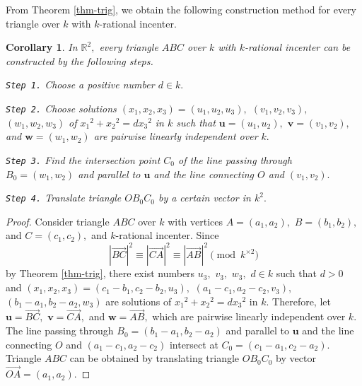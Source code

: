 \documentclass{article}
\theoremstyle{definition}
\theoremstyle{plain}
\newtheorem{cor}{Corollary}
\newenvironment{pf}{\begin{proof}}{\end{proof}}
\begin{document}
From Theorem \ref{thm-trig}, we obtain the following construction method for every triangle over $k$ with $k$-rational incenter.
\begin{cor}
In $\mathbb R^2,$ every triangle $ABC$ over $k$ with $k$-rational incenter can be constructed by the following steps.\par
{\tt Step 1.} 
Choose a positive number $d \in k.$\par
{\tt Step 2.} 
Choose solutions $(x_1,x_2,x_3) = (u_1,u_2,u_3),$ $(v_1,v_2,v_3),$ $(w_1,w_2,w_3)$ of $x_1{}^2+x_2{}^2 = dx_3{}^2$ in $k$ such that $\bm{u} = (u_1,u_2),$ $\bm{v} = (v_1,v_2),$ and $\bm{w} = (w_1,w_2)$ are pairwise linearly independent over $k.$\par
{\tt Step 3.} 
Find the intersection point $C_0$ of the line passing through $B_0 = (w_1,w_2)$ and parallel to $\bm{u}$ and the line connecting $O$ and $(v_1,v_2).$\par
{\tt Step 4.} 
Translate triangle $OB_0C_0$ by a certain vector in $k^2.$
\end{cor}
\begin{pf}
Consider triangle $ABC$ over $k$ with vertices $A = (a_1,a_2),$ $B = (b_1,b_2),$ and $C = (c_1,c_2),$ and $k$-rational incenter. 
Since 
\[ |\overrightarrow{BC}|^2 \equiv |\overrightarrow{CA}|^2 \equiv |\overrightarrow{AB}|^2 \pmod{k^{\times 2}}\] 
by Theorem \ref{thm-trig}, there exist numbers $u_3,$ $v_3,$ $w_3,$ $d \in k$ such that $d > 0$ and $(x_1,x_2,x_3) = (c_1-b_1,c_2-b_2,u_3),$ $(a_1-c_1,a_2-c_2,v_3),$ $(b_1-a_1,b_2-a_2,w_3)$ are solutions of $x_1{}^2+x_2{}^2 = dx_3{}^2$ in $k.$ 
Therefore, let $\bm{u} = \overrightarrow{BC},$ $\bm{v} = \overrightarrow{CA},$ and $\bm{w} = \overrightarrow{AB},$ which are pairwise linearly independent over $k.$ 
The line passing through $B_0 = (b_1-a_1,b_2-a_2)$ and parallel to $\bm{u}$ and the line connecting $O$ and $(a_1-c_1,a_2-c_2)$ intersect at $C_0 = (c_1-a_1,c_2-a_2).$ 
Triangle $ABC$ can be obtained by translating triangle $OB_0C_0$ by vector $\overrightarrow{OA} = (a_1,a_2).$
\end{pf}
\end{document}
